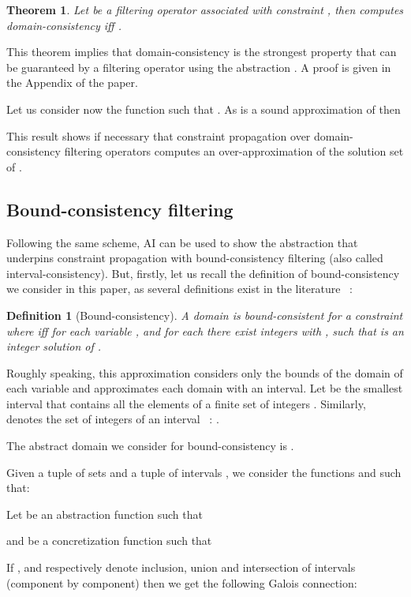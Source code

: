 \documentclass[submission,copyright,creativecommons]{eptcs}
\newtheorem{definition}{Definition}
\newtheorem{theorem}{Theorem}
\begin{document}
\begin{theorem}
\label{theo:arc}
  Let  be a filtering operator associated with constraint , then  computes domain-consistency iff
  . 
\end{theorem}
\noindent
This theorem implies that domain-consistency is the strongest property that can be guaranteed by a filtering 
operator using the abstraction . A proof is given in the Appendix of the paper.

\noindent
Let us consider now the function  such that 
.
As  is a sound approximation of  then


\noindent
This result shows if necessary that constraint propagation over domain-consistency filtering 
operators computes an over-approximation of the solution set of .


\subsection{Bound-consistency filtering}
\label{sec:bornes}

Following the same scheme, AI can be used to show the abstraction that underpins
constraint propagation with bound-consistency filtering (also called interval-consistency). But, firstly, let
us recall the definition of bound-consistency we consider in this paper, as several definitions exist in the 
literature \cite{CHL06}~:
\begin{definition}[Bound-consistency]
A domain  is bound-consistent for a constraint  where  
iff for each variable ,  and for each 
there exist integers  with , 
such that  is an integer solution of .
\end{definition}
\noindent 
Roughly speaking, this approximation considers only the bounds of the domain of each variable and
approximates each domain with an interval. 
Let  be the smallest interval that contains all the elements of a finite set of integers .
Similarly,  denotes the set of integers of an interval ~: . 

\noindent
The abstract domain we consider for bound-consistency is 
.

\noindent
Given a tuple of sets  and a tuple of intervals
, we consider the functions 
 and  such that:



\noindent
Let  be an abstraction function such that 

and  be a concretization function such that 


\noindent
If ,  and
 respectively denote inclusion, union and
intersection of intervals (component by component) then we get the following Galois connection:
\end{document}
